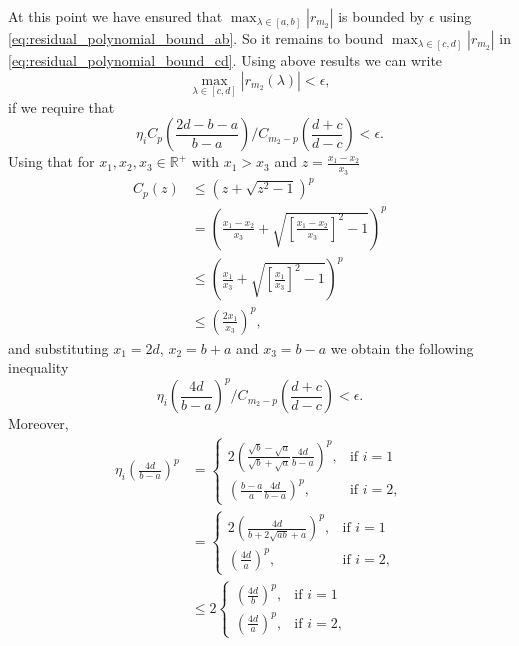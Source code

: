 At this point we have ensured that $\max_{\lambda \in [a,b]}|r_{m_2}|$ is bounded by $\epsilon$ using \cref{eq:residual_polynomial_bound_ab}. So it remains to bound $\max_{\lambda \in [c,d]}|r_{m_2}|$ in \cref{eq:residual_polynomial_bound_cd}. Using above results we can write
\begin{equation*}
    \max_{\lambda \in [c,d]} |r_{m_2}(\lambda)| < \epsilon,
\end{equation*}
if we require that
\begin{equation}
    \eta_i C_{p}\left(\frac{2d - b - a}{b - a}\right) /C_{m_2-p}\left(\frac{d+c}{d-c}\right) < \epsilon.
    \label{eq:relative_error_bound_mp}
\end{equation}
Using that for $x_1, x_2, x_3 \in \mathbb{R}^+$ with $x_1 > x_3$ and $z = \frac{x_1 - x_2}{x_3}$
\begin{align*}
    C_p(z) & \leq \left(z + \sqrt{z^2 - 1}\right)^p                                                    \\
           & = \left( \frac{x_1 - x_2}{x_3} + \sqrt{ \left[\frac{x_1 - x_2}{x_3}\right]^2 -1}\right)^p \\
           & \leq \left( \frac{x_1}{x_3} + \sqrt{ \left[\frac{x_1}{x_3}\right]^2 - 1}\right)^p         \\
           & \leq \left( \frac{2x_1}{x_3}\right)^p,
\end{align*}
and substituting $x_1 = 2d$, $x_2 = b + a$ and $x_3 = b - a$ we obtain the following inequality
\begin{equation}
    \eta_i \left(\frac{4d}{b-a} \right)^p /C_{m_2-p}\left(\frac{d+c}{d-c}\right) < \epsilon.
    \label{eq:chebyshev_degree_p_bound}
\end{equation}
Moreover,
\begin{align*}
    \eta_i \left(\frac{4d}{b-a}\right)^p & =
    \begin{cases}
        2\left(\frac{\sqrt{b} - \sqrt{a}}{\sqrt{b} + \sqrt{a}} \frac{4d}{b-a}\right)^p , & \text{if } i = 1  \\
        \left(\frac{b - a}{a}\frac{4d}{b-a}\right)^p                                   , & \text{if } i = 2,
    \end{cases} \\
                                         & =
    \begin{cases}
        2\left(\frac{4d}{b + 2\sqrt{ab} + a}\right)^p , & \text{if } i = 1  \\
        \left(\frac{4d}{a}\right)^p                   , & \text{if } i = 2,
    \end{cases}                                                                                                                                \\
                                         & \leq 2
    \begin{cases}
        \left(\frac{4d}{b}\right)^p, &\text{if } i = 1  \\
        \left(\frac{4d}{a}\right)^p, &\text{if } i = 2,
    \end{cases}
\end{align*}
